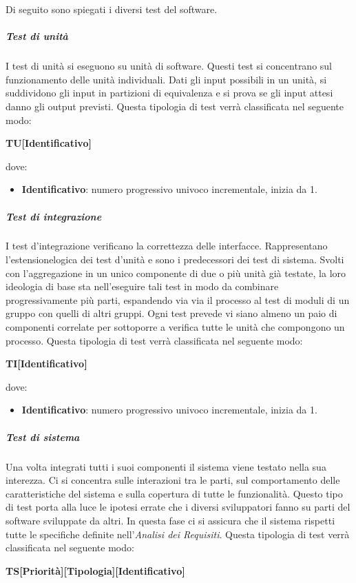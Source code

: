 			Di seguito sono spiegati i diversi test del software.
			\subparagraph{Test di unità}
			I test di unità si eseguono su unità di software. Questi test si concentrano sul funzionamento delle unità individuali. Dati gli input possibili in un unità, si suddividono gli input in partizioni di equivalenza e si prova se gli input attesi danno gli output previsti.
			Questa tipologia di test verrà classificata nel seguente modo:
			\begin{center}
				\textbf{TU[Identificativo]}
			\end{center}
			dove:
			\begin{itemize}
				\item \textbf{Identificativo}: numero progressivo univoco incrementale, inizia da 1.
			\end{itemize}
			\subparagraph{Test di integrazione}
			I test d’integrazione verificano la correttezza delle interfacce. Rappresentano l’estensionelogica dei test d’unità e sono i predecessori dei test di sistema. Svolti con l’aggregazione in un unico componente di due o più unità già testate, la loro ideologia di base sta nell’eseguire tali test in modo da combinare progressivamente più parti, espandendo via via il processo al test di moduli di un gruppo con quelli di altri gruppi. Ogni test prevede vi siano almeno un paio di componenti correlate per sottoporre a verifica tutte le unità che compongono un processo.
			Questa tipologia di test verrà classificata nel seguente modo:
			\begin{center}
				\textbf{TI[Identificativo]}
			\end{center}
			dove:
			\begin{itemize}
				\item \textbf{Identificativo}: numero progressivo univoco incrementale, inizia da 1.
			\end{itemize}
			\subparagraph{Test di sistema}
			Una volta integrati tutti i suoi componenti il sistema viene testato nella sua interezza. Ci si concentra sulle interazioni tra le parti, sul comportamento delle caratteristiche del sistema e sulla copertura di tutte le funzionalità. Questo tipo di test porta alla luce le ipotesi errate che i diversi sviluppatori fanno su parti del software sviluppate da altri. In questa fase ci si assicura che il sistema rispetti tutte le specifiche definite nell'\textit{Analisi dei Requisiti}.
			Questa tipologia di test verrà classificata nel seguente modo:
			\begin{center}
				\textbf{TS[Priorità][Tipologia][Identificativo]}
			\end{center}
